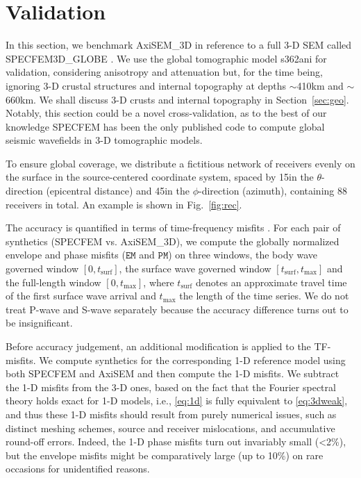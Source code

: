 \documentclass[extra,referee]{gji}
\begin{document}
\section{Validation}
\label{sec:ben}
In this section, we benchmark AxiSEM\_3D in reference to 
a full 3-D SEM called SPECFEM3D\_GLOBE 
\cite[SPECFEM,][]{komatitsch2002spectralI,komatitsch2002spectralII}. 
We use the global tomographic model s362ani \cite[]{kustowski2008s362ani}
for validation, considering anisotropy \cite[]{van2014seismic}
and attenuation \cite[]{van2014optimized} but, for the time being,
ignoring 3-D crustal structures and internal topography at depths 
$\sim$410km and $\sim$660km. 
We shall discuss 3-D crusts and internal topography in Section~\ref{sec:geo}. 
Notably, this section could be a novel cross-validation, 
as to the best of our knowledge SPECFEM has been
the only published code to compute global seismic wavefields in 
3-D tomographic models.  

To ensure global coverage, we distribute a fictitious network of receivers 
evenly on the surface in the source-centered coordinate system, 
spaced by 15\degr in the $\theta$-direction (epicentral distance) and 
45\degr in the $\phi$-direction (azimuth), containing 88 receivers in total. 
An example is shown in Fig.~\ref{fig:rec}.


The accuracy is quantified in terms of time-frequency misfits
\cite[TF-misfits,][]{kristekova2009time}. 
For each pair of synthetics (SPECFEM vs. AxiSEM\_3D), 
we compute the globally normalized 
envelope and phase misfits ($\mathtt{EM}$ and $\mathtt{PM}$) 
on three windows, the body wave governed window $[0,t_\text{surf}]$,
the surface wave governed window $[t_\text{surf},t_\text{max}]$ and 
the full-length window $[0,t_\text{max}]$, 
where $t_\text{surf}$ denotes an 
approximate travel time of the first surface wave arrival
and $t_\text{max}$ the length of the time series. 
We do not treat P-wave and S-wave separately because the accuracy
difference turns out to be insignificant.

Before accuracy judgement, an additional modification is applied to 
the TF-misfits. We compute synthetics for the corresponding
1-D reference model using both SPECFEM and AxiSEM 
\cite[the mature 1-D version,][]{nissen2014axisem} 
and then compute the 1-D misfits. 
We subtract the 1-D misfits from the 3-D ones, based on the fact
that the Fourier spectral theory holds exact for 1-D models, 
i.e., \eqref{eq:1d} is fully equivalent to \eqref{eq:3dweak}, 
and thus these 1-D misfits should result from purely numerical issues, 
such as distinct meshing schemes, source and receiver mislocations, and 
accumulative round-off errors.  
Indeed, the 1-D phase misfits turn out invariably small (\textless 2\%), 
but the envelope misfits might be comparatively large (up to 10\%)
on rare occasions for unidentified reasons. 
\end{document}
